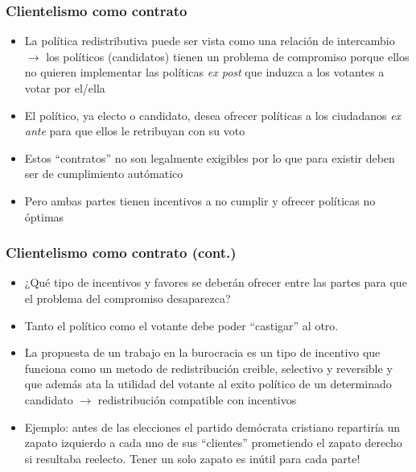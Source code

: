 \documentclass[handout,final,xcolor=dvipsnames]{beamer}
\begin{document}
  \begin{frame}\frametitle{Clientelismo como contrato}
  \begin{itemize}\itemsep 10pt
      \item La política redistributiva puede ser vista como una
        relación de intercambio $\longrightarrow$ los políticos (candidatos) tienen un problema de compromiso porque ellos no
        quieren implementar las políticas \textit{ex post} que induzca
        a los votantes a votar por el/ella
        \item El político, ya electo o candidato, desea ofrecer
          políticas a los ciudadanos \textit{ex ante} para que ellos
          le retribuyan con su voto
        \item Estos ``contratos'' no son legalmente exigibles por lo
          que para existir deben ser de cumplimiento autómatico
          \item Pero ambas partes tienen incentivos  a no cumplir y
            ofrecer políticas no óptimas
     
    \end{itemize}
  \end{frame}



  \begin{frame}\frametitle{Clientelismo como contrato (cont.)}
  \begin{itemize}\itemsep 10pt
      \item ¿Qué tipo de incentivos y favores se deberán ofrecer entre
        las partes para que el problema del compromiso desaparezca?
        \item Tanto el político como el votante debe poder
          ``castigar'' al otro.
          \item La propuesta de un trabajo en la burocracia es un tipo
            de incentivo que funciona como un metodo de redistribución
            creible, selectivo y reversible y que además ata la
            utilidad del votante al exito político de un determinado
            candidato $\longrightarrow$ redistribución compatible con
            incentivos
            
            \item Ejemplo: antes de las elecciones el partido
              demócrata cristiano repartiría un zapato izquierdo a
              cada uno de sus ``clientes'' prometiendo el zapato
              derecho si resultaba reelecto. Tener un solo zapato es
              inútil para cada parte!
    \end{itemize}
  \end{frame}
\end{document}
